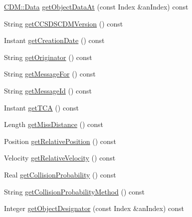 \begin{DoxyCompactItemize}
\item 
\hyperlink{structostk_1_1astro_1_1conjunction_1_1messages_1_1ccsds_1_1_c_d_m_1_1_data}{C\+D\+M\+::\+Data} \hyperlink{classostk_1_1astro_1_1conjunction_1_1messages_1_1ccsds_1_1_c_d_m_a85aa2c1a85b11269cb9d3959aab5a6b0}{get\+Object\+Data\+At} (const Index \&an\+Index) const
\item 
String \hyperlink{classostk_1_1astro_1_1conjunction_1_1messages_1_1ccsds_1_1_c_d_m_a296b90cccabb587922cbb751371b307c}{get\+C\+C\+S\+D\+S\+C\+D\+M\+Version} () const
\item 
Instant \hyperlink{classostk_1_1astro_1_1conjunction_1_1messages_1_1ccsds_1_1_c_d_m_a11fd7cdbb4c7dae61fa28cecfea3c8ef}{get\+Creation\+Date} () const
\item 
String \hyperlink{classostk_1_1astro_1_1conjunction_1_1messages_1_1ccsds_1_1_c_d_m_a9e01b351ceb60243b78fd66836427d94}{get\+Originator} () const
\item 
String \hyperlink{classostk_1_1astro_1_1conjunction_1_1messages_1_1ccsds_1_1_c_d_m_ae7762cdbd576f6431003d30cef1e5ba6}{get\+Message\+For} () const
\item 
String \hyperlink{classostk_1_1astro_1_1conjunction_1_1messages_1_1ccsds_1_1_c_d_m_a912baf7125357181bcfcf44696e7d75a}{get\+Message\+Id} () const
\item 
Instant \hyperlink{classostk_1_1astro_1_1conjunction_1_1messages_1_1ccsds_1_1_c_d_m_a2b700f334c4c08dd3b9fd72cb9c702dc}{get\+T\+CA} () const
\item 
Length \hyperlink{classostk_1_1astro_1_1conjunction_1_1messages_1_1ccsds_1_1_c_d_m_a40c7d5b606e08430b2911c9bb35e3656}{get\+Miss\+Distance} () const
\item 
Position \hyperlink{classostk_1_1astro_1_1conjunction_1_1messages_1_1ccsds_1_1_c_d_m_adb363b9c8acd269e068d6759359f3711}{get\+Relative\+Position} () const
\item 
Velocity \hyperlink{classostk_1_1astro_1_1conjunction_1_1messages_1_1ccsds_1_1_c_d_m_a68703343174a89e0da870b6bccb84586}{get\+Relative\+Velocity} () const
\item 
Real \hyperlink{classostk_1_1astro_1_1conjunction_1_1messages_1_1ccsds_1_1_c_d_m_a1a77fac319da01e08ba4df8e6e3f97eb}{get\+Collision\+Probability} () const
\item 
String \hyperlink{classostk_1_1astro_1_1conjunction_1_1messages_1_1ccsds_1_1_c_d_m_a2495fa0813f45c8c9551c15330384d59}{get\+Collision\+Probability\+Method} () const
\item 
Integer \hyperlink{classostk_1_1astro_1_1conjunction_1_1messages_1_1ccsds_1_1_c_d_m_a4cf0e373d7e25b3ba66ca21b9b9a5cf9}{get\+Object\+Designator} (const Index \&an\+Index) const

\end{DoxyCompactItemize}
